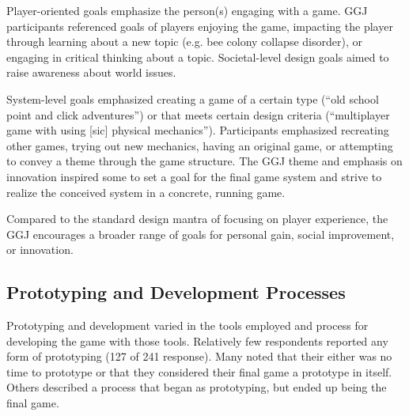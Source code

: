 \documentclass{sig-alternate}
\begin{document}
Player-oriented goals emphasize the person(s) engaging with a game.
GGJ participants referenced goals of players enjoying the game, impacting the player through learning about a new topic (e.g. bee colony collapse disorder), or engaging in critical thinking about a topic. Societal-level design goals aimed to raise awareness about world issues.

System-level goals emphasized creating a game of a certain type (``old school point and click adventures'') or that meets certain design criteria (``multiplayer game with using [sic] physical mechanics''). Participants emphasized recreating other games, trying out new mechanics, having an original game, or attempting to convey a theme through the game structure. The GGJ theme and emphasis on innovation inspired some to set a goal for the final game system and strive to realize the conceived system in a concrete, running game.

Compared to the standard design mantra of focusing on player experience, the GGJ encourages a broader range of goals for personal gain, social improvement, or innovation. 


\subsection{Prototyping and Development Processes}
Prototyping and development varied in the tools employed and process for developing the game with those tools. Relatively few respondents reported any form of prototyping (127 of 241 response). Many noted that their either was no time to prototype or that they considered their final game a prototype in itself. Others described a process that began as prototyping, but ended up being the final game.

\end{document}
